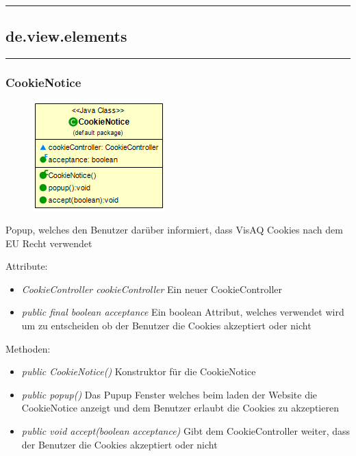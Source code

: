 \rule{\textwidth}{0.4pt}
\subsection{de.view.elements}

\rule{\textwidth}{0.4pt}
\subsubsection{CookieNotice}
\begin{minipage}{0.3\textwidth}
    \begin{figure}[H]
        {\centering\includegraphics[scale = 0.5
        ]{media/view/CookieNotice_Class.png}}
    \end{figure}
    \end{minipage} \hfill
    \begin{minipage}{0.6\textwidth}
Popup, welches den Benutzer darüber informiert, dass VisAQ Cookies nach dem EU Recht verwendet
\end{minipage}
\vspace{\baselineskip}
Attribute: \begin{itemize} [noitemsep]
     \item \emph{CookieController cookieController} Ein neuer CookieController
    \item \emph{public final boolean acceptance} Ein boolean Attribut, welches verwendet wird um zu entscheiden ob der Benutzer die Cookies akzeptiert oder nicht
\end{itemize}
Methoden: \begin{itemize} [noitemsep]
    \item \emph{public CookieNotice()} Konstruktor für die CookieNotice
    \item \emph{public popup()} Das Pupup Fenster welches beim laden der Website die CookieNotice anzeigt und dem Benutzer erlaubt die Cookies zu akzeptieren
    \item \emph{public void accept(boolean acceptance)} Gibt dem CookieController weiter, dass der Benutzer die Cookies akzeptiert oder nicht
\end{itemize}


